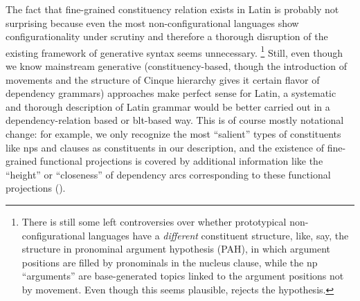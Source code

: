 {The fact that fine-grained constituency relation exists in Latin 
is probably not surprising because
even the most non-configurational languages show configurationality 
under scrutiny
\citep[among others]{niedzielski2017clausal,morris2018evidence,legate2002warlpiri}
and therefore a thorough disruption 
of the existing framework of generative syntax seems unnecessary.%
\footnote{
    There is still some left controversies over 
    whether prototypical non-configurational languages 
    have a \emph{different} constituent structure,
    like, say, the structure in pronominal argument hypothesis (PAH),
    in which argument positions are filled by pronominals 
    in the nucleus clause,
    while the \acs{np} ``arguments'' are base-generated topics 
    linked to the argument positions not by movement.
    Even though this seems plausible, 
    \cite{legate2002warlpiri} rejects the hypothesis.
}
Still, even though we know mainstream generative (constituency-based, 
though the introduction of movements and the structure of Cinque hierarchy
gives it certain flavor of dependency grammars) approaches make perfect sense for Latin,
a systematic and thorough description of Latin grammar 
would be better carried out in a dependency-relation based or \acs{blt}-based way.
This is of course mostly notational change:
for example, we only recognize the most ``salient'' types of constituents 
like \acs{np}s and clauses as constituents in our description,
and the existence of fine-grained functional projections is covered by 
additional information like the ``height'' or ``closeness'' of dependency arcs
corresponding to these functional projections
().

}
